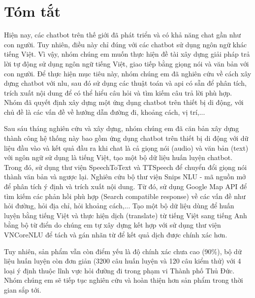 \chapter*{Tóm tắt}
\label{tomtat}
Hiện nay, các chatbot trên thế giới đã phát triển và có khả năng chat gần như con người. Tuy nhiên, điều này chỉ đúng với các chatbot sử dụng ngôn ngữ khác tiếng Việt. Vì vậy, nhóm chúng em muốn thực hiện đề tài xây dựng giải pháp trả lời tự động sử dụng ngôn ngữ tiếng Việt, giao tiếp bằng giọng nói và văn bản với con người. Để thực hiện mục tiêu này, nhóm chúng em đã nghiên cứu về cách xây dựng chatbot với \ac{nlu}, sau đó sử dụng các thuật toán và \ac{api} có sẵn để phân tích, trích xuất nội dung để có thể hiểu câu hỏi và tìm kiếm câu trả lời phù hợp. Nhóm đã quyết định xây dựng một ứng dụng chatbot trên thiết bị di động, với chủ đề là các vấn đề về hướng dẫn đường đi, khoảng cách, vị trí,...

Sau sáu tháng nghiên cứu và xây dựng, nhóm chúng em đã căn bản xây dựng thành công hệ thống này bao gồm ứng dụng chatbot trên thiết bị di động với dữ liệu đầu vào và kết quả đầu ra khi chat là cả giọng nói (audio) và văn bản (text) với ngôn ngữ sử dụng là tiếng Việt, tạo một bộ dữ liệu huấn luyện chatbot. Trong đó, sử dụng thư viện SpeechToText và TTSpeech để chuyển đổi giọng nói thành văn bản và ngược lại. Nghiên cứu bộ thư viện Snips NLU - mã nguồn mở để phân tích ý định và trích xuất nội dung. Từ đó, sử dụng Google Map API để tìm kiếm các phản hồi phù hợp (Search compatible response) về các vấn đề như hỏi đường, hỏi địa chỉ, hỏi khoảng cách,... Tạo một bộ dữ liệu dùng để huấn luyện bằng tiếng Việt và thực hiện dịch (translate) từ tiếng Việt sang tiếng Anh bằng bộ từ điển do chúng em tự xây dựng kết hợp với sử dụng thư viện VNCoreNLU để tách và gán nhãn từ để kết quả dịch được chính xác hơn.

Tuy nhiên, sản phẩm vẫn còn điểm yếu là độ chính xác chưa cao (90\%), bộ dữ liệu huấn luyện còn đơn giản (3200 câu huấn luyện và 120 câu kiểm thử) với 4 loại ý định thuộc lĩnh vực hỏi đường đi trong phạm vi Thành phố Thủ Đức. Nhóm chúng em sẽ tiếp tục nghiên cứu và hoàn thiện hơn sản phẩm trong thời gian sắp tới. 
